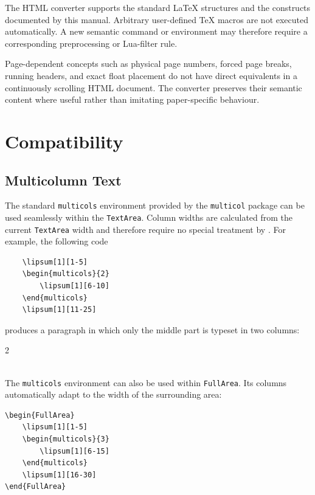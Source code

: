 \documentclass[
11pt,
a4paper,
oneside
]{scrbook}
\begin{document}
{The HTML converter supports the standard \LaTeX{} structures and the
\mdlayout{} constructs documented by this manual. Arbitrary user-defined TeX
macros are not executed automatically. A new semantic command or environment
may therefore require a corresponding preprocessing or Lua-filter rule.

Page-dependent concepts such as physical page numbers, forced page breaks,
running headers, and exact float placement do not have direct equivalents in a
continuously scrolling HTML document. The converter preserves their semantic
content where useful rather than imitating paper-specific behaviour.

\chapter{Compatibility}

\section{Multicolumn Text}
The standard \texttt{multicols} environment provided by the
\texttt{multicol} package can be used seamlessly within the
\texttt{TextArea}. Column widths are calculated from the current
\texttt{TextArea} width and therefore require no special treatment
by \mdlayout{}.
For example, the following code
\begin{verbatim}
	\lipsum[1][1-5]
	\begin{multicols}{2}
		\lipsum[1][6-10]
	\end{multicols}
	\lipsum[1][11-25]
\end{verbatim}
produces a paragraph in which only the middle part is typeset in two
columns:\\[1ex]

\lipsum[1][1-5]
\begin{multicols}{2}
	\lipsum[1][6-10]
\end{multicols}
\lipsum[1][11-25] \\[2ex]

\noindent The \texttt{multicols} environment can also be used within
\texttt{FullArea}. Its columns automatically adapt to the width of
the surrounding area:
\begin{verbatim}
\begin{FullArea}
	\lipsum[1][1-5]
	\begin{multicols}{3}
		\lipsum[1][6-15]
	\end{multicols}
	\lipsum[1][16-30]
\end{FullArea}
	

\end{verbatim}}
\end{document}
